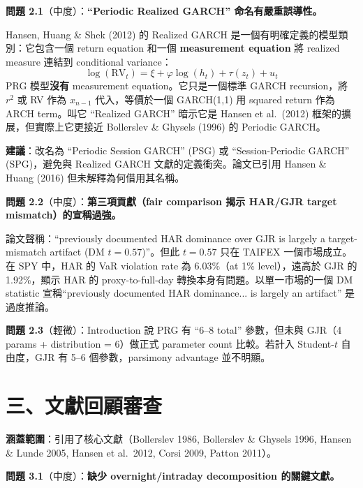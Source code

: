 \documentclass[12pt,a4paper]{article}
\begin{document}
\textbf{問題 2.1}（\textcolor{warncolor}{中度}）：\textbf{``Periodic Realized GARCH'' 命名有嚴重誤導性。}

Hansen, Huang \& Shek (2012) 的 Realized GARCH 是一個有明確定義的模型類別：它包含一個 return equation 和一個 \textbf{measurement equation} 將 realized measure 連結到 conditional variance：
\[
    \log(\text{RV}_t) = \xi + \varphi \log(h_t) + \tau(z_t) + u_t
\]
PRG 模型\textbf{沒有} measurement equation。它只是一個標準 GARCH recursion，將 $r^2$ 或 RV 作為 $x_{n-1}$ 代入，等價於一個 GARCH(1,1) 用 squared return 作為 ARCH term。叫它 ``Realized GARCH'' 暗示它是 Hansen et al.\ (2012) 框架的擴展，但實際上它更接近 Bollerslev \& Ghysels (1996) 的 Periodic GARCH。

\textbf{建議}：改名為 ``Periodic Session GARCH'' (PSG) 或 ``Session-Periodic GARCH'' (SPG)，避免與 Realized GARCH 文獻的定義衝突。論文已引用 Hansen \& Huang (2016) 但未解釋為何借用其名稱。

\textbf{問題 2.2}（\textcolor{warncolor}{中度}）：\textbf{第三項貢獻（fair comparison 揭示 HAR/GJR target mismatch）的宣稱過強。}

論文聲稱：``previously documented HAR dominance over GJR is largely a target-mismatch artifact (DM $t = 0.57$)''。但此 $t = 0.57$ 只在 TAIFEX 一個市場成立。在 SPY 中，HAR 的 VaR violation rate 為 6.03\%（at 1\% level），遠高於 GJR 的 1.92\%，顯示 HAR 的 proxy-to-full-day 轉換本身有問題。以單一市場的一個 DM statistic 宣稱``previously documented HAR dominance... is largely an artifact'' 是過度推論。

\textbf{問題 2.3}（輕微）：Introduction 說 PRG 有 ``6--8 total'' 參數，但未與 GJR（4 params + distribution = 6）做正式 parameter count 比較。若計入 Student-$t$ 自由度，GJR 有 5--6 個參數，parsimony advantage 並不明顯。


\section{三、文獻回顧審查}

\textbf{涵蓋範圍}：引用了核心文獻（Bollerslev 1986, Bollerslev \& Ghysels 1996, Hansen \& Lunde 2005, Hansen et al.\ 2012, Corsi 2009, Patton 2011）。

\textbf{問題 3.1}（\textcolor{warncolor}{中度}）：\textbf{缺少 overnight/intraday decomposition 的關鍵文獻。}
\end{document}
